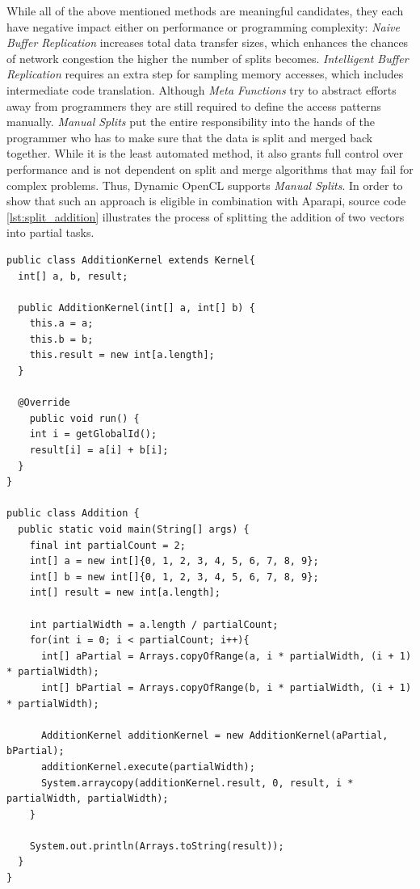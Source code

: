 While all of the above mentioned methods are meaningful candidates, they each have negative impact either on performance or programming complexity: \textit{Naive Buffer Replication} increases total data transfer sizes, which enhances the chances of network congestion the higher the number of splits becomes. \textit{Intelligent Buffer Replication} requires an extra step for sampling memory accesses, which includes intermediate code translation. Although \textit{Meta Functions} try to abstract efforts away from programmers they are still required to define the access patterns manually. \textit{Manual Splits} put the entire responsibility into the hands of the programmer who has to make sure that the data is split and merged back together. While it is the least automated method, it also grants full control over performance and is not dependent on split and merge algorithms that may fail for complex problems. Thus, Dynamic OpenCL supports \textit{Manual Splits}. In order to show that such an approach is eligible in combination with Aparapi, source code \ref{lst:split_addition} illustrates the process of splitting the addition of two vectors into partial tasks.


\begin{lstlisting}[caption=Partial Aparapi Vector Addition Kernel,captionpos=b,label=lst:split_addition]
public class AdditionKernel extends Kernel{
  int[] a, b, result;

  public AdditionKernel(int[] a, int[] b) {
    this.a = a;
    this.b = b;
    this.result = new int[a.length];
  }

  @Override
    public void run() {
    int i = getGlobalId();
    result[i] = a[i] + b[i];
  }
}

public class Addition {
  public static void main(String[] args) {
    final int partialCount = 2;
	int[] a = new int[]{0, 1, 2, 3, 4, 5, 6, 7, 8, 9};
	int[] b = new int[]{0, 1, 2, 3, 4, 5, 6, 7, 8, 9};
	int[] result = new int[a.length];

	int partialWidth = a.length / partialCount;
	for(int i = 0; i < partialCount; i++){
      int[] aPartial = Arrays.copyOfRange(a, i * partialWidth, (i + 1) * partialWidth);
      int[] bPartial = Arrays.copyOfRange(b, i * partialWidth, (i + 1) * partialWidth);

	  AdditionKernel additionKernel = new AdditionKernel(aPartial, bPartial);
      additionKernel.execute(partialWidth);
      System.arraycopy(additionKernel.result, 0, result, i * partialWidth, partialWidth);
	}

	System.out.println(Arrays.toString(result));
  }
}

\end{lstlisting}


